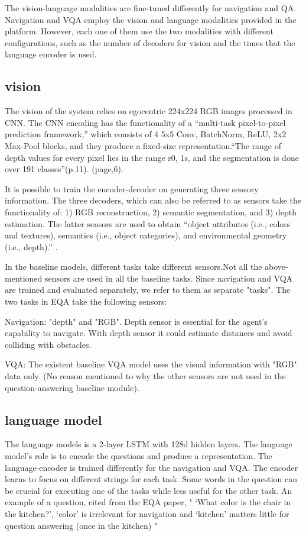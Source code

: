 The vision-language modalities are fine-tuned differently for navigation and QA. Navigation and VQA employ the vision and language modalities provided in the platform. However, each one of them use the two modalities with different configurations, such as the number of decoders for vision and  the times that the language encoder is used.  


\subsection{vision}

The vision of the system relies on egocentric 224x224 RGB images processed in CNN. The CNN encoding has the functionality of a “multi-task pixel-to-pixel prediction framework,” which consists of 4 {5x5 Conv, BatchNorm, ReLU, 2x2 Max-Pool blocks}, and they produce a fixed-size representation.“The range of depth values for every pixel lies in the range r0, 1s, and the segmentation is done over 191 classes”(p.11). (page,6). 

It  is possible to train the encoder-decoder on generating  three sensory information. The three decoders, which can also be referred to as sensors take the functionality of: 1) RGB reconstruction, 2) semantic segmentation, and 3) depth estimation. The latter sensors are used to obtain “object attributes (i.e., colors and textures), semantics (i.e., object categories), and environmental geometry (i.e., depth).” . 

In the baseline models, different tasks take different sensors.Not all the above-mentioned sensors are used in all the baseline tasks. Since navigation and VQA are trained and evaluated separately, we refer to them as separate "tasks". The two tasks in EQA take the following sensors: 

{Navigation}:  "depth" and "RGB". Depth sensor is essential for the agent's capability to navigate. With depth sensor it could estimate distances and avoid colliding with obstacles.  

{VQA}: The existent baseline VQA model uses the visual information with "RGB" data only. (No reason mentioned to why the other sensors are not used in the question-answering baseline module).  


\subsection{language model}

The language models is a 2-layer LSTM with 128d hidden layers. The language model's role is to encode the questions and produce a representation. The language-encoder is trained differently for the navigation and VQA. The encoder learns to focus on different strings for each task. Some words in the question can be crucial for executing one of the tasks while less useful for the other task. An example of a question, cited from the EQA paper, " ‘What color is the chair in the kitchen?’, ‘color’ is irrelevant for navigation and ‘kitchen’ matters little for question answering (once in the kitchen) "

